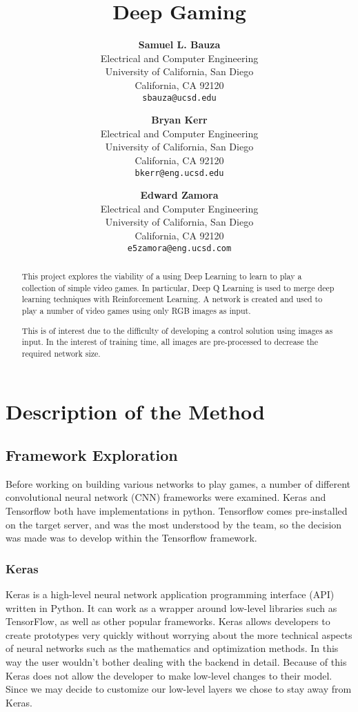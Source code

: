 \documentclass{article}
\title{Deep Gaming}
\author{
  \textbf{Samuel L. Bauza}\\
  Electrical and Computer Engineering\\
  University of California, San Diego\\
  California, CA 92120 \\
  \texttt{sbauza@ucsd.edu} \\
  \and
  \textbf{Bryan Kerr}\\
  Electrical and Computer Engineering\\
  University of California, San Diego\\
  California, CA 92120 \\
  \texttt{bkerr@eng.ucsd.edu} \\
  \and
  \textbf{Edward Zamora}\\
  Electrical and Computer Engineering\\
  University of California, San Diego\\
  California, CA 92120 \\
  \texttt{e5zamora@eng.ucsd.com} \\
}
\begin{document}

\maketitle

\begin{abstract}

This project explores the viability of a using Deep Learning to learn to play a collection of simple video games. In particular, Deep Q Learning is used to merge deep learning techniques with Reinforcement Learning. A network is created and used to play a number of video games using only RGB images as input. 

This is of interest due to the difficulty of developing a control solution using images as input. In the interest of training time, all images are pre-processed to decrease the required network size.


\end{abstract}

\section{Description of the Method}

\subsection{Framework Exploration}

Before working on building various networks to play games, a number of different convolutional neural network (CNN) frameworks were examined. Keras and Tensorflow both have implementations in python. Tensorflow comes pre-installed on the target server, and was the most understood by the team, so the decision was made was to develop within the Tensorflow framework.

\subsubsection{Keras}

Keras is a high-level neural network application programming interface (API) written in Python. It can work as a wrapper around low-level libraries such as TensorFlow, as well as other popular frameworks. Keras allows developers to create prototypes very quickly without worrying about the more technical aspects of neural networks such as the mathematics and optimization methods. In this way the user wouldn't bother dealing with the backend in detail. Because of this Keras does not allow the developer to make low-level changes to their model. Since we may decide to customize our low-level layers we chose to stay away from Keras. 
\end{document}
